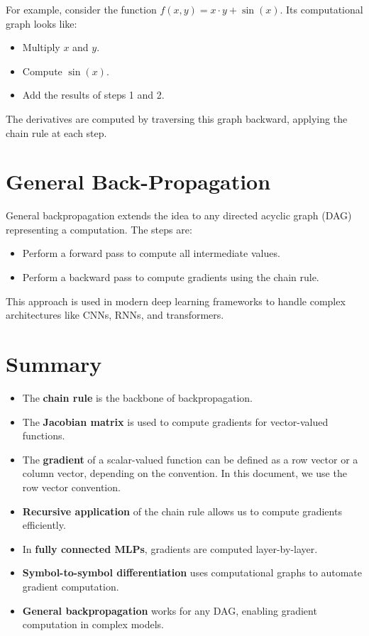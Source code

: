 \begin{notechapter}
For example, consider the function \( f(x, y) = x \cdot y + \sin(x) \). Its computational graph looks like:
\begin{itemize}
    \item Multiply \( x \) and \( y \).
    \item Compute \( \sin(x) \).
    \item Add the results of steps 1 and 2.
\end{itemize}

The derivatives are computed by traversing this graph backward, applying the chain rule at each step.

\section{General Back-Propagation}
General backpropagation extends the idea to any directed acyclic graph (DAG) representing a computation. The steps are:
\begin{itemize}
    \item Perform a forward pass to compute all intermediate values.
    \item Perform a backward pass to compute gradients using the chain rule.
\end{itemize}

This approach is used in modern deep learning frameworks to handle complex architectures like CNNs, RNNs, and transformers.

\section{Summary}
\begin{itemize}
    \item The \textbf{chain rule} is the backbone of backpropagation.
    \item The \textbf{Jacobian matrix} is used to compute gradients for vector-valued functions.
    \item The \textbf{gradient} of a scalar-valued function can be defined as a row vector or a column vector, depending on the convention. In this document, we use the row vector convention.
    \item \textbf{Recursive application} of the chain rule allows us to compute gradients efficiently.
    \item In \textbf{fully connected MLPs}, gradients are computed layer-by-layer.
    \item \textbf{Symbol-to-symbol differentiation} uses computational graphs to automate gradient computation.
    \item \textbf{General backpropagation} works for any DAG, enabling gradient computation in complex models.
\end{itemize}
\end{notechapter}
